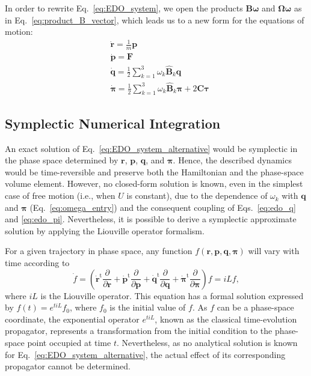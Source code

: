 \documentclass[aip,jcp,reprint,amsmath,amssymb]{revtex4-1}
\newcommand{\mt}[1]{\boldsymbol{\mathbf{#1}}}           %
\newcommand{\vt}[1]{\boldsymbol{\mathbf{#1}}}           %
\newcommand{\tr}[1]{#1^\text{t}}                               %
\newcommand{\diff}[2]{\dfrac{\partial #1}{\partial #2}} %
\begin{document}
In order to rewrite Eq.~\ref{eq:EDO_system}, we open the products $\mt B \vt \omega$ and $\mt \Omega \vt \omega$ as in Eq.~\ref{eq:product_B_vector}, which leads us to a new form for the equations of motion:
\begin{subequations}
\label{eq:EDO_system_alternative}
\begin{align}
&\dot{\vt r} = \frac{1}{m} \vt p \\
&\dot{\vt p} = \vt F \\
&\dot{\vt q} = \frac{1}{2} \sum_{k=1}^3 \omega_k \hat{\mt B}_k \vt q \label{eq:edo_q} \\
&\dot{\vt \pi} = \frac{1}{2} \sum_{k=1}^3 \omega_k \hat{\mt B}_k \vt \pi + 2 \mt C \vt \tau \label{eq:edo_pi}
\end{align}
\end{subequations}

\subsection{Symplectic Numerical Integration}  
\label{sec:symplectic}

An exact solution of Eq.~\ref{eq:EDO_system_alternative} would be symplectic in the phase space determined by $\vt r$, $\vt p$, $\vt q$, and $\vt \pi$. Hence, the described dynamics would be time-reversible and preserve both the Hamiltonian and the phase-space volume element. However, no closed-form solution is known, even in the simplest case of free motion (i.e., when $U$ is constant), due to the dependence of $\omega_k$ with $\vt q$ and $\vt \pi$ (Eq.~\ref{eq:omega_entry}) and the consequent coupling of Eqs.~\ref{eq:edo_q} and \ref{eq:edo_pi}. Nevertheless, it is possible to derive a symplectic approximate solution by applying the Liouville operator formalism.\cite{Tuckerman2010}

For a given trajectory in phase space, any function $f(\vt r, \vt p, \vt q, \vt \pi)$ will vary with time according to
\[
\dot{f} = \left( \tr{\dot{\vt r}} \diff{}{\vt r} + \tr{\dot{\vt p}} \diff{}{\vt p} + \tr{\dot{\vt q}} \diff{}{\vt q} + \tr{\dot{\vt \pi}} \diff{}{\vt \pi} \right) f = i\!L f,
\]
where $i\!L$ is the Liouville operator. This equation has a formal solution expressed by $f(t) = e^{t i\!L}f_0$, where $f_0$ is the initial value of $f$. As $f$ can be a phase-space coordinate, the exponential operator $e^{t i\!L}$, known as the classical time-evolution propagator,\cite{Tuckerman2008} represents a transformation from the initial condition to the phase-space point occupied at time $t$. Nevertheless, as no analytical solution is known for Eq.~\ref{eq:EDO_system_alternative}, the actual effect of its corresponding propagator cannot be determined.
\end{document}
